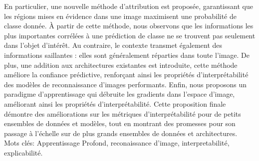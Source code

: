 \noindent En particulier, une nouvelle méthode d'attribution est proposée, garantissant que les 
régions mises en évidence dans une image maximisent une probabilité de classe donnée. À partir de 
cette méthode, nous observons que les informations les plus importantes corrélées à une prédiction 
de classe ne se trouvent pas seulement dans l'objet d'intérêt. Au contraire, le contexte transmet 
également des informations saillantes : elles sont généralement réparties dans toute l'image. De 
plus, une addition aux architectures existantes est introduite, cette méthode améliore la confiance 
prédictive, renforçant ainsi les propriétés d'interprétabilité des modèles de reconnaissance 
d'images performants. Enfin, nous proposons un paradigme d'apprentissage qui débruite les gradients 
dans l'espace d'image, améliorant ainsi les propriétés d'interprétabilité. Cette proposition finale 
démontre des améliorations 
sur les métriques d'interprétabilité pour de petits ensembles de données et modèles, tout en 
montrant des promesses pour son passage à l'échelle sur de plus grands ensembles de données et 
architectures.\\

\vspace{0.5cm}
Mots clés: Apprentissage Profond, reconaissance d'image, interpretabilité, explicabilité.
